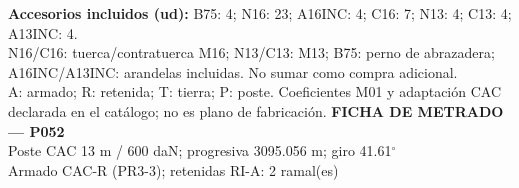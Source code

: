 \begingroup\scriptsize
\textbf{Accesorios incluidos (ud):} B75: 4; N16: 23; A16INC: 4; C16: 7; N13: 4; C13: 4; A13INC: 4.\\
N16/C16: tuerca/contratuerca M16; N13/C13: M13; B75: perno de abrazadera; A16INC/A13INC: arandelas incluidas. No sumar como compra adicional.\\
A: armado; R: retenida; T: tierra; P: poste. Coeficientes M01 y adaptación CAC declarada en el catálogo; no es plano de fabricación.
\endgroup\endgroup
\clearpage{}
\begingroup\small\setlength{\parskip}{3pt}\renewcommand{\arraystretch}{1.05}
\textbf{\large FICHA DE METRADO — P052}\\[4pt]
Poste CAC 13 m / 600 daN; progresiva 3095.056 m; giro 41.61\ensuremath{^\circ}\\
Armado CAC-R (PR3-3); retenidas RI-A: 2 ramal(es)\\
\begingroup\scriptsize
